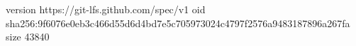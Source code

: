 version https://git-lfs.github.com/spec/v1
oid sha256:9f6076e0eb3c466d55d6d4bd7e5c705973024c4797f2576a9483187896a267fa
size 43840
